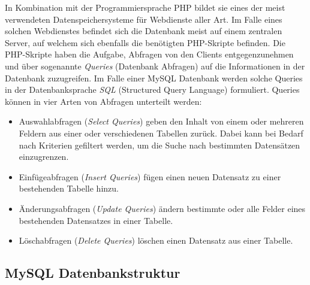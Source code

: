 \documentclass[a4paper,11pt]{report}
\begin{document}
				In Kombination mit der Programmiersprache PHP bildet sie eines der meist verwendeten Datenspeichersysteme für Webdienste aller Art. Im Falle eines solchen Webdienstes befindet sich die Datenbank meist auf einem zentralen Server, auf welchem sich ebenfalls die benötigten PHP-Skripte befinden. Die PHP-Skripte haben die Aufgabe, Abfragen von den Clients entgegenzunehmen und über sogenannte \emph{Queries} (Datenbank Abfragen) auf die Informationen in der Datenbank zuzugreifen. Im Falle einer MySQL Datenbank werden solche Queries in der Datenbanksprache \emph{SQL} (Structured Query Language) formuliert. Queries können in vier Arten von Abfragen unterteilt werden: \cite[S. 760]{IT-Handbuch}
				
				\begin{itemize}
					\item Auswahlabfragen (\emph{Select Queries}) geben den Inhalt von einem oder mehreren Feldern aus einer oder verschiedenen Tabellen zurück. Dabei kann bei Bedarf nach Kriterien gefiltert werden, um die Suche nach bestimmten Datensätzen einzugrenzen.\cite[S. 746]{IT-Handbuch}
					\item Einfügeabfragen (\emph{Insert Queries}) fügen einen neuen Datensatz zu einer bestehenden Tabelle hinzu.\cite[S. 746]{IT-Handbuch}
					\item Änderungsabfragen (\emph{Update Queries}) ändern bestimmte oder alle Felder eines bestehenden Datensatzes in einer Tabelle.\cite[S. 746]{IT-Handbuch}
					\item Löschabfragen (\emph{Delete Queries}) löschen einen Datensatz aus einer Tabelle. \cite[S. 746]{IT-Handbuch}
				\end{itemize}
				
				\subsection{MySQL Datenbankstruktur} \label{databankstructure}
				
\end{document}
